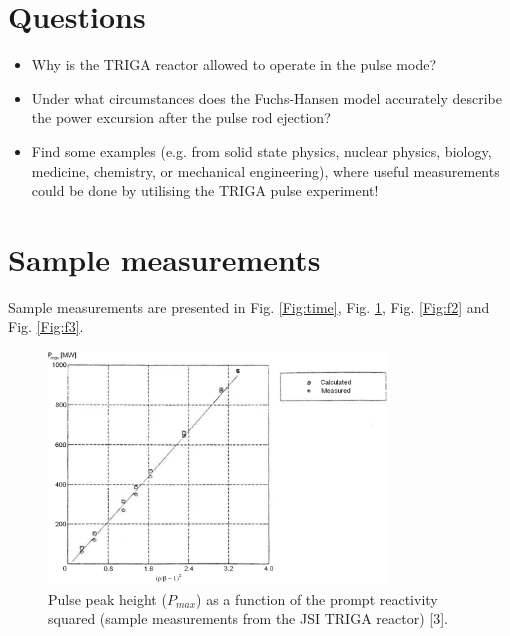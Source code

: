 \documentclass[a4paper,12pt]{article}
\begin{document}
\section{Questions}

\begin{itemize}[noitemsep]
	\item Why is the TRIGA reactor allowed to operate in the pulse mode?
	\item Under what circumstances does the Fuchs-Hansen model accurately describe the power excursion after the pulse rod ejection?
	\item Find some examples (e.g. from solid state physics, nuclear physics, biology, medicine, chemistry, or mechanical engineering), where useful measurements could be done by utilising the TRIGA pulse experiment! 
\end{itemize}


\section{Sample measurements}

Sample measurements are presented in Fig. \ref{Fig:time}, Fig. \ref{Fig:f1}, Fig. \ref{Fig:f2} and Fig. \ref{Fig:f3}.



\begin{figure}[ht!]
	\centering
	\includegraphics[width=0.8\textwidth]{fig1.png}
	\caption{Pulse peak height ($P_{max}$) as a function of the prompt reactivity squared (sample measurements from the JSI TRIGA reactor) [3].}
	\label{Fig:f1}
\end{figure}
\end{document}
